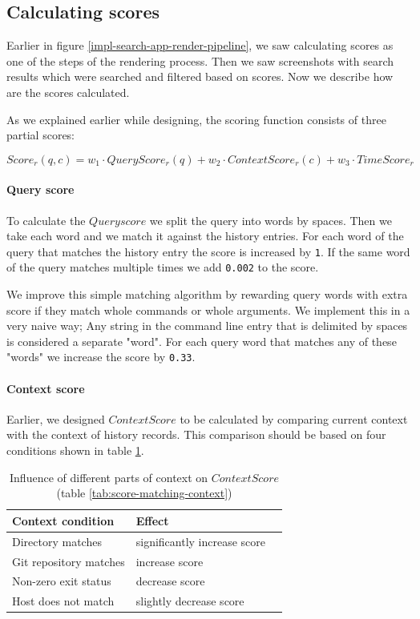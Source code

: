 \clearpage
\subsection{Calculating scores}

Earlier in figure \ref{impl-search-app-render-pipeline}, we saw calculating scores as one of the steps of the rendering process. Then we saw screenshots with search results which were searched and filtered based on scores. Now we describe how are the scores calculated.

As we explained earlier while designing, the scoring function consists of three partial scores:

\[ Score_r(q,c) = w_1 \cdot QueryScore_r(q) + w_2 \cdot ContextScore_r(c) + w_3 \cdot TimeScore_r \]


\paragraph{Query score}

To calculate the \(Query score\) we split the query into words by spaces. Then we take each word and we match it against the history entries. For each word of the query that matches the history entry the score is increased by \verb|1|. If the same word of the query matches multiple times we add \verb|0.002| to the score. 


We improve this simple matching algorithm by rewarding query words with extra score if they match whole commands or whole arguments. We implement this in a very naive way; Any string in the command line entry that is delimited by spaces is considered a separate "word". For each query word that matches any of these "words" we increase the score by \verb|0.33|.

\paragraph{Context score}

Earlier, we designed \(ContextScore\) to be calculated by comparing current context with the context of history records. This comparison should be based on four conditions shown in table \ref{tab:copy-of-score-matching-context}.

\begin{table}[h!]
\centering
\begin{tabular}{lll}
\hline \hline
Context condition       & Effect \\
\hline
Directory matches      & significantly increase score \\ 
Git repository matches & increase score \\ 
Non-zero exit status   & decrease score \\
Host does not match    & slightly decrease score \\ 
\hline \hline
\end{tabular}
\caption{Influence of different parts of context on \(ContextScore\) (table \ref{tab:score-matching-context})}
\label{tab:copy-of-score-matching-context}
\end{table}


